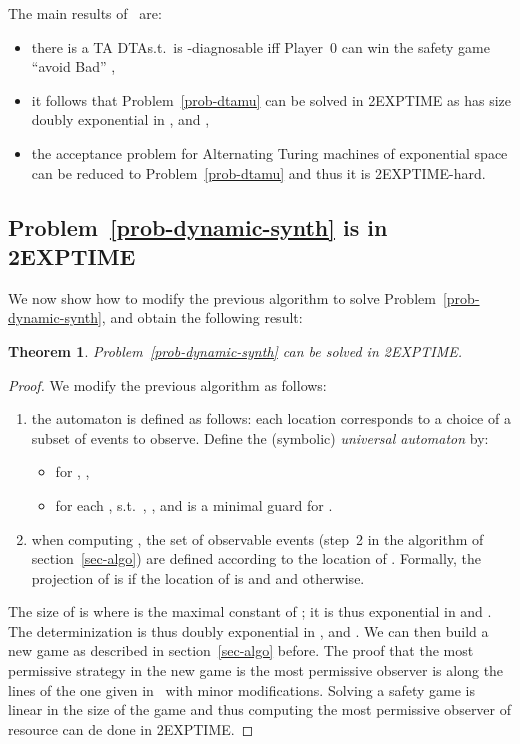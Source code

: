 \documentclass[letterpaper,10pt,conference]{ieeeconf}  \IEEEoverridecommandlockouts                              \overrideIEEEmargins
\def\st{{s.t.}~}
\newtheorem{theorem}{Theorem}
\def\dtamu{DTA\xspace}
\begin{document}
The main results of~\cite{Bouyerfossacs05} are:
\begin{itemize}
\item there is a TA  \dtamu \st  is -diagnosable
  iff Player~0 can win the safety game ``avoid Bad''
  ,
\item it follows that Problem~\ref{prob-dtamu} can be solved in
  2EXPTIME as  has size doubly exponential in ,
   and ,
\item the acceptance problem for Alternating Turing machines of exponential
  space can be reduced to Problem~\ref{prob-dtamu} and thus it
  is 2EXPTIME-hard.
\end{itemize}


\subsection{Problem~\ref{prob-dynamic-synth} is in 2EXPTIME} \label{sec-synth}
We now show how to modify the previous algorithm to solve
Problem~\ref{prob-dynamic-synth}, and obtain the following result:
\begin{theorem}
  Problem~\ref{prob-dynamic-synth} can be solved in 2EXPTIME.
\end{theorem}
\begin{proof}
  We modify the previous algorithm as follows:
  \begin{enumerate}
  \item the automaton  is defined as follows: each location
    corresponds to a choice of a subset of events to observe. Define
    the (symbolic) \emph{universal automaton}
     by:
\begin{itemize}
\item for , ,
\item  for each , 
  \st , , and  is a minimal guard for
  . 
\end{itemize}
\item when computing , the set of
  observable events (step~2 in the algorithm of
  section~\ref{sec-algo}) are defined according to the location  of
  .  Formally, the projection of  is  if the
  location of  is  and  and  otherwise.
  \end{enumerate}
  The size of  is  where  is
  the maximal constant of ; it is thus exponential in
   and .  The determinization is thus doubly exponential
  in ,  and . We can then build a new game
   as described in section~\ref{sec-algo} before.
  The proof that the most permissive strategy in the new game
   is the most permissive observer is along the
  lines of the one given in~\cite{Bouyerfossacs05} with minor
  modifications.
Solving a safety game is linear in the size of the game and thus
  computing the most permissive observer of resource  can de done
  in 2EXPTIME.
\end{proof}
\end{document}
